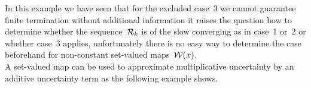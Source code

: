 %
\noindent In this example we have seen that for the excluded case~3 we cannot guarantee finite termination without additional information it raises the question how to determine whether the sequence~$\mathcal R_k$ is of the slow converging as in case~1 or~2 or whether case~3 applies, unfortunately there is no easy way to determine the case beforehand for non-constant set-valued maps~$\mathcal W(x)$.
%
\\[1em]
%
\noindent A set-valued map can be used to approximate multiplicative uncertainty by an additive uncertainty term as the following example shows.
%
%
